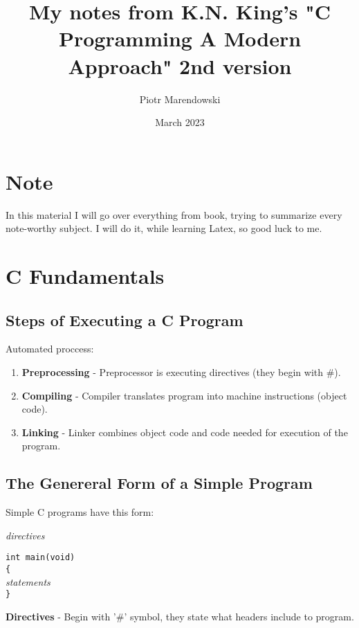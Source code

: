 \documentclass[12pt, openany]{book}
\title{My notes from K.N. King's "C Programming A Modern Approach" 2nd version}
\author{Piotr Marendowski}
\date{March 2023}
\newcommand\tab[1][20px]{\hspace*{#1}}      %
\begin{document}
    \maketitle

    \chapter{Note}
    In this material I will go over everything from book,
    trying to summarize every note-worthy subject. I will do
    it, while learning Latex, so good luck to me.

    \tableofcontents

    \chapter{C Fundamentals}
    
    \section{Steps of Executing a C Program}
    Automated proccess:
    \begin{enumerate}
        \item\textbf{Preprocessing} - Preprocessor is executing directives
        (they begin with \#).
        \item\textbf{Compiling} - Compiler translates program into machine
        instructions (object code).
        \item\textbf{Linking} - Linker combines object code and code needed
        for execution of the program.
    \end{enumerate}

    \section{The Genereral Form of a Simple Program}
    Simple C programs have this form:

    \bigskip
    \textit{directives}
    \smallskip

    \small\texttt{int main(void)} \\
    \small\texttt{\{} \\
    \tab\textit{statements} \\
    \small\texttt{\}}
    \bigskip

    \textbf{Directives} - Begin with '\#' symbol, they state what headers
    include to program.
\end{document}
